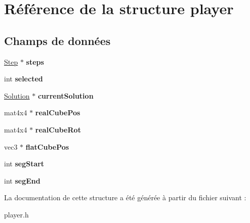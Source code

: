 \hypertarget{structplayer}{\section{Référence de la structure player}
\label{structplayer}
}
\subsection*{Champs de données}
\begin{DoxyCompactItemize}
\item 
\hypertarget{structplayer_a9e027465ed2f9e1258ba283809c118df}{\hyperlink{struct_step}{Step} $\ast$ {\bfseries steps}}\label{structplayer_a9e027465ed2f9e1258ba283809c118df}

\item 
\hypertarget{structplayer_adab4da51ba40d5a492becdceccccbfcd}{int {\bfseries selected}}\label{structplayer_adab4da51ba40d5a492becdceccccbfcd}

\item 
\hypertarget{structplayer_a2a1d123731a9be1e0ed2e323791c9371}{\hyperlink{struct_solution}{Solution} $\ast$ {\bfseries current\-Solution}}\label{structplayer_a2a1d123731a9be1e0ed2e323791c9371}

\item 
\hypertarget{structplayer_a100ea492c7219d5f82c0a8b98862e1a6}{mat4x4 $\ast$ {\bfseries real\-Cube\-Pos}}\label{structplayer_a100ea492c7219d5f82c0a8b98862e1a6}

\item 
\hypertarget{structplayer_a41c5401863e40ad986677726ac4159df}{mat4x4 $\ast$ {\bfseries real\-Cube\-Rot}}\label{structplayer_a41c5401863e40ad986677726ac4159df}

\item 
\hypertarget{structplayer_a6e07d4ca233327af7eace5988ea6c92e}{vec3 $\ast$ {\bfseries flat\-Cube\-Pos}}\label{structplayer_a6e07d4ca233327af7eace5988ea6c92e}

\item 
\hypertarget{structplayer_a9ea7749ed861b907234661c34e3e61ba}{int {\bfseries seg\-Start}}\label{structplayer_a9ea7749ed861b907234661c34e3e61ba}

\item 
\hypertarget{structplayer_a83bbdc59197cce731de19c7c6db6270a}{int {\bfseries seg\-End}}\label{structplayer_a83bbdc59197cce731de19c7c6db6270a}

\end{DoxyCompactItemize}


La documentation de cette structure a été générée à partir du fichier suivant \-:\begin{DoxyCompactItemize}
\item 
player.\-h\end{DoxyCompactItemize}
